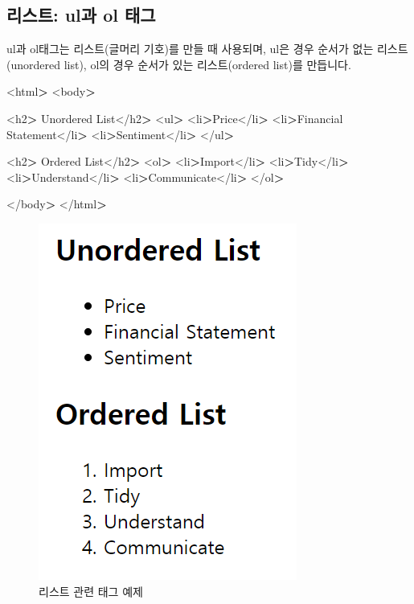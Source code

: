 \documentclass[12pt,]{book}
\newenvironment{Shaded}{\begin{snugshade}}{\end{snugshade}}
\newcommand{\NormalTok}[1]{#1}
\newcommand{\OperatorTok}[1]{\textcolor[rgb]{0.81,0.36,0.00}{\textbf{#1}}}
\begin{document}
\hypertarget{ul-ol-}{%
\subsection{리스트: ul과 ol 태그}\label{ul-ol-}}

ul과 ol태그는 리스트(글머리 기호)를 만들 때 사용되며, ul은 경우 순서가 없는 리스트(unordered list), ol의 경우 순서가 있는 리스트(ordered list)를 만듭니다.

\begin{Shaded}
\begin{Highlighting}[]
\NormalTok{<html}\OperatorTok{>}
\NormalTok{<body}\OperatorTok{>}

\NormalTok{<h2}\OperatorTok{>}\NormalTok{ Unordered List</h2}\OperatorTok{>}
\NormalTok{<ul}\OperatorTok{>}
\NormalTok{  <li}\OperatorTok{>}\NormalTok{Price</li}\OperatorTok{>}
\NormalTok{  <li}\OperatorTok{>}\NormalTok{Financial Statement</li}\OperatorTok{>}
\NormalTok{  <li}\OperatorTok{>}\NormalTok{Sentiment</li}\OperatorTok{>}
\NormalTok{</ul}\OperatorTok{>}  

\NormalTok{<h2}\OperatorTok{>}\NormalTok{ Ordered List</h2}\OperatorTok{>}
\NormalTok{<ol}\OperatorTok{>}
\NormalTok{  <li}\OperatorTok{>}\NormalTok{Import</li}\OperatorTok{>}
\NormalTok{  <li}\OperatorTok{>}\NormalTok{Tidy</li}\OperatorTok{>}
\NormalTok{  <li}\OperatorTok{>}\NormalTok{Understand</li}\OperatorTok{>}
\NormalTok{  <li}\OperatorTok{>}\NormalTok{Communicate</li}\OperatorTok{>}
\NormalTok{ </ol}\OperatorTok{>} 

\NormalTok{</body}\OperatorTok{>}
\NormalTok{</html}\OperatorTok{>}
\end{Highlighting}
\end{Shaded}

\begin{figure}[h]

{\centering \includegraphics[width=0.7\linewidth]{images/html_4} 

}

\caption{리스트 관련 태그 예제}\label{fig:unnamed-chunk-12}
\end{figure}
\end{document}
